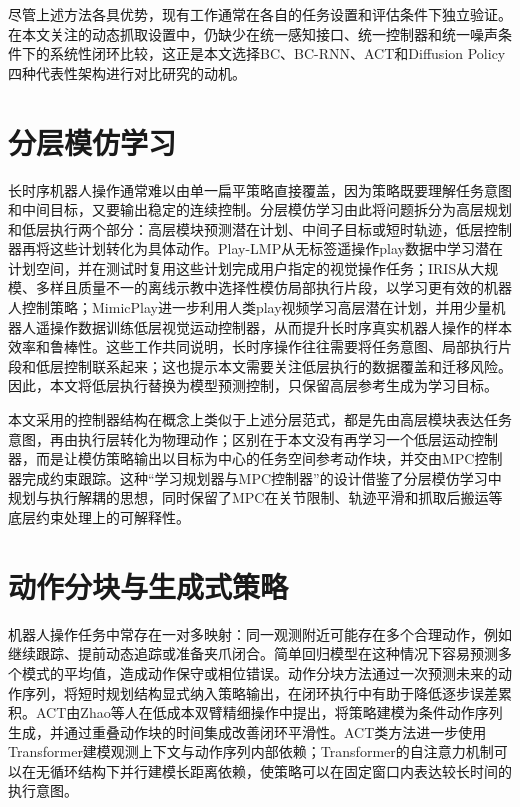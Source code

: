 尽管上述方法各具优势，现有工作通常在各自的任务设置和评估条件下独立验证\citep{mandlekar2021matters,zhao2023learning,chi2023diffusion}。在本文关注的动态抓取设置中，仍缺少在统一感知接口、统一控制器和统一噪声条件下的系统性闭环比较，这正是本文选择BC、BC-RNN、ACT和Diffusion Policy四种代表性架构进行对比研究的动机。

\section{分层模仿学习}

长时序机器人操作通常难以由单一扁平策略直接覆盖，因为策略既要理解任务意图和中间目标，又要输出稳定的连续控制\citep{lynch2020learning,mandlekar2020iris,wang2023mimicplay}。分层模仿学习由此将问题拆分为高层规划和低层执行两个部分：高层模块预测潜在计划、中间子目标或短时轨迹，低层控制器再将这些计划转化为具体动作。Play-LMP从无标签遥操作play数据中学习潜在计划空间，并在测试时复用这些计划完成用户指定的视觉操作任务\citep{lynch2020learning}；IRIS从大规模、多样且质量不一的离线示教中选择性模仿局部执行片段，以学习更有效的机器人控制策略\citep{mandlekar2020iris}；MimicPlay进一步利用人类play视频学习高层潜在计划，并用少量机器人遥操作数据训练低层视觉运动控制器，从而提升长时序真实机器人操作的样本效率和鲁棒性\citep{wang2023mimicplay}。这些工作共同说明，长时序操作往往需要将任务意图、局部执行片段和低层控制联系起来；这也提示本文需要关注低层执行的数据覆盖和迁移风险。因此，本文将低层执行替换为模型预测控制，只保留高层参考生成为学习目标。

本文采用的控制器结构在概念上类似于上述分层范式，都是先由高层模块表达任务意图，再由执行层转化为物理动作；区别在于本文没有再学习一个低层运动控制器，而是让模仿策略输出以目标为中心的任务空间参考动作块，并交由MPC控制器完成约束跟踪。这种“学习规划器与MPC控制器”的设计借鉴了分层模仿学习中规划与执行解耦的思想，同时保留了MPC在关节限制、轨迹平滑和抓取后搬运等底层约束处理上的可解释性。

\section{动作分块与生成式策略}

机器人操作任务中常存在一对多映射：同一观测附近可能存在多个合理动作，例如继续跟踪、提前动态追踪或准备夹爪闭合。简单回归模型在这种情况下容易预测多个模式的平均值，造成动作保守或相位错误\citep{bishop1994mixture,florence2022implicit}。动作分块方法通过一次预测未来的动作序列，将短时规划结构显式纳入策略输出\citep{zhao2023learning}，在闭环执行中有助于降低逐步误差累积。ACT由Zhao等人在低成本双臂精细操作中提出，将策略建模为条件动作序列生成，并通过重叠动作块的时间集成改善闭环平滑性\citep{zhao2023learning}。ACT类方法进一步使用Transformer建模观测上下文与动作序列内部依赖；Transformer的自注意力机制可以在无循环结构下并行建模长距离依赖\citep{vaswani2017attention}，使策略可以在固定窗口内表达较长时间的执行意图。

